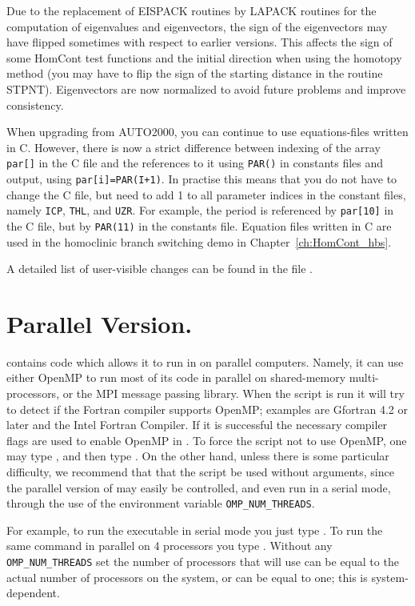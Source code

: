 \documentclass[12pt]{report}
\begin{document}
Due to the replacement of EISPACK routines by LAPACK routines for the
computation of eigenvalues and eigenvectors, the sign of the
eigenvectors may have flipped sometimes with respect to earlier
versions. This affects the sign of some {\cal HomCont}
test functions and the initial direction when using the homotopy
method (you may have to flip the sign of the starting distance
in the routine STPNT). Eigenvectors are now normalized to avoid
future problems and improve consistency.

When upgrading from {\cal AUTO2000}, you can continue to use
equations-files written in C. However, there is now a strict
difference between indexing of the array {\tt par[]} in the
C file and the references to it using {\tt PAR()} in constants
files and output, using {\tt par[i]=PAR(I+1)}. In practise this
means that you do not have to change the C file, but need to
add 1 to all parameter indices in the constant files, namely
{\tt ICP}, {\tt THL}, and {\tt UZR}. For example,
the period is referenced by {\tt par[10]} in the C file,
but by {\tt PAR(11)} in the constants file. Equation files
written in C are used in the homoclinic branch switching
demo in Chapter~\ref{ch:HomCont_hbs}.
 
A detailed list of user-visible changes can be found in the file
.

\section{ Parallel Version.} \label{sec:Parallel}
\AUTO contains code which allows
it to run in on parallel computers.  Namely,
it can use either OpenMP to run most of its code in parallel
on shared-memory multi-processors, or the MPI message passing
library.
When the  script is run it will try to
detect if the Fortran compiler supports OpenMP; examples
are Gfortran 4.2 or later and the Intel Fortran Compiler.
If it is successful the necessary compiler flags are used
to enable OpenMP in \AUTO.
To force the  script not to use OpenMP,
one may type ,
and then type .
On the other hand, unless there is some
particular difficulty, we recommend that that the 
 script be used without arguments, since the
parallel version of \AUTO may easily be controlled,
and even run in a serial mode,  
through the use of the environment variable {\tt OMP\_NUM\_THREADS}.

For example, to run the \AUTO executable 
in serial mode you just type .
To run the same command in parallel on 4 processors you type 
. Without any {\tt OMP\_NUM\_THREADS}
set the number of processors that \AUTO will use can be equal to the
actual number of processors on the system, or can be equal to one;
this is system-dependent.
\end{document}

